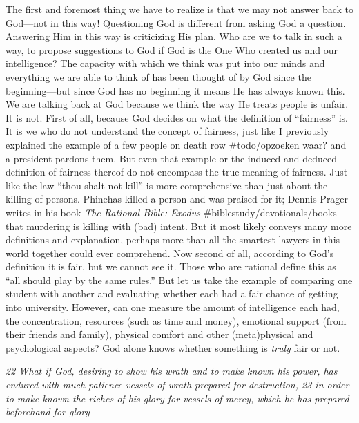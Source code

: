 The first and foremost thing we have to realize is that we may not
answer back to God---not in this way! Questioning God is different from
asking God a question. Answering Him in this way is criticizing His
plan. Who are we to talk in such a way, to propose suggestions to God if
God is the One Who created us and our intelligence? The capacity with
which we think was put into our minds and everything we are able to
think of has been thought of by God since the beginning---but since God
has no beginning it means He has always known this. We are talking back
at God because we think the way He treats people is unfair. It is not.
First of all, because God decides on what the definition of ``fairness''
is. It is we who do not understand the concept of fairness, just like I
previously explained the example of a few people on death row
\#todo/opzoeken waar? and a president pardons them. But even that
example or the induced and deduced definition of fairness thereof do not
encompass the true meaning of fairness. Just like the law ``thou shalt
not kill'' is more comprehensive than just about the killing of persons.
Phinehas killed a person and was praised for it; Dennis Prager writes in
his book \emph{The Rational Bible: Exodus}
\#biblestudy/devotionals/books that murdering is killing with (bad)
intent. But it most likely conveys many more definitions and
explanation, perhaps more than all the smartest lawyers in this world
together could ever comprehend. Now second of all, according to God's
definition it is fair, but we cannot see it. Those who are rational
define this as ``all should play by the same rules.'' But let us take
the example of comparing one student with another and evaluating whether
each had a fair chance of getting into university. However, can one
measure the amount of intelligence each had, the concentration,
resources (such as time and money), emotional support (from their
friends and family), physical comfort and other (meta)physical and
psychological aspects? God alone knows whether something is \emph{truly}
fair or not.

\emph{22 What if God, desiring to show his wrath and to make known his
power, has endured with much patience vessels of wrath prepared for
destruction, 23 in order to make known the riches of his glory for
vessels of mercy, which he has prepared beforehand for glory---}

